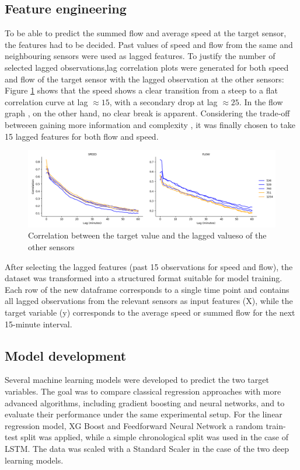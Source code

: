 	\subsection{Feature engineering}
	To be able to predict the summed flow and average speed at the target sensor, the features had to be decided. Past values of speed and flow from the same and neighbouring sensors were used as lagged features.
	To justify the number of selected lagged observations,lag correlation  plots were generated for both speed and flow of the target sensor with the lagged observation at the other sensors:
	Figure \ref{fig:correlation_lag} shows that the speed shows a clear transition from a steep to a flat correlation curve at lag $\approx  15$, with a secondary drop at lag $\approx 25$.
	In the flow graph , on the other hand, no clear break is apparent.
	Considering the trade-off betweeen gaining more information and complexity , it was finally chosen to take 15 lagged features for both flow and speed.
	\begin{figure}[H]
		\centering
		\includegraphics[width =0.99 \linewidth]{../Plots/Correlation_lag_flow_speed_peak}
		\caption{Correlation between the target value and the lagged valueso of the other sensors}
		\label{fig:correlation_lag}
	\end{figure}
	\noindent After selecting the lagged features (past 15 observations for speed and flow), the dataset was transformed into a structured format suitable for model training. Each row of the new dataframe corresponds to a single time point and contains all lagged observations from the relevant sensors as input features (X), while the target variable (y) corresponds to the average speed or summed flow for the next 15-minute interval. 
	\subsection{Model development}
	Several machine learning models were developed to predict the two target variables. The goal was to compare classical regression approaches with more advanced algorithms, including gradient boosting and neural networks, and to evaluate their performance under the same experimental setup.
	For the linear regression model, XG Boost and Feedforward Neural Network a random train-test split was applied, while a simple chronological split was used in the case of LSTM. The data was scaled with a Standard Scaler in the case of the two deep learning models.
